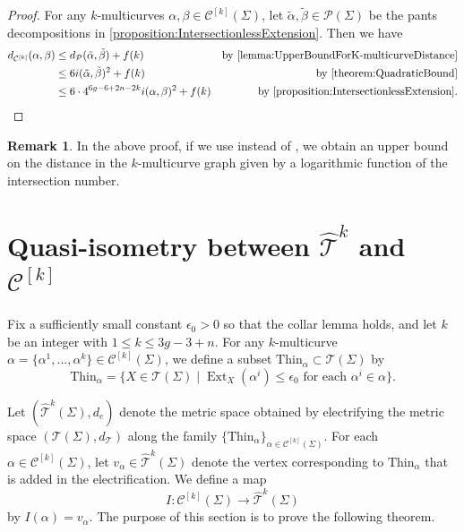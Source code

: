 \documentclass[a4paper,11pt]{amsart}
\numberwithin{equation}{section}
\theoremstyle{definition}
\newtheorem{remark}[theorem]{Remark}
\newcommand{\Teich}{\mathcal{T}}
\newcommand{\elTeich}{\hat{\mathcal{T}}}
\DeclareMathOperator{\Ext}{Ext}
\newcommand{\Thin}{\mathrm{Thin}}
\newcommand{\multicurve}[1]{\mathcal{C}^{[#1]}}
\begin{document}
\begin{proof}
    For any $k$-multicurves $\alpha,\beta\in\multicurve{k}(\Sigma)$, let $\tilde{\alpha},\tilde{\beta}\in \mathcal{P}(\Sigma)$ be the pants decompositions in \cref{proposition:IntersectionlessExtension}.
    Then we have 
    \begin{align*}
        d_{\multicurve{k}}(\alpha,\beta) &\leq d_{\mathcal{P}}(\tilde{\alpha},\tilde{\beta})+f(k) & \text{by \cref{lemma:UpperBoundForK-multicurveDistance}}\\
        & \leq 6i(\tilde{\alpha},\tilde{\beta})^2+f(k) & \text{by \cref{theorem:QuadraticBound}} \\
        & \leq 6\cdot 4^{6g-6+2n-2k}i(\alpha,\beta)^2+f(k) & \text{by \cref{proposition:IntersectionlessExtension}.}
    \end{align*}
\end{proof}

\begin{remark}
In the above proof, if we use  instead of , we obtain an upper bound on the distance in the $k$-multicurve graph given by a logarithmic function of the intersection number.
\end{remark}

\section{Quasi-isometry between $\elTeich^k$ and $\multicurve{k}$}

Fix a sufficiently small constant $\epsilon_0>0$ so that the collar lemma holds, and let $k$ be an integer with $1 \le k \le 3g-3+n$.
For any $k$-multicurve $\alpha = \{\alpha^1,\ldots,\alpha^k\} \in \multicurve{k}(\Sigma)$,
we define a subset $\Thin_\alpha \subset \Teich(\Sigma)$ by
\begin{equation*}
    \Thin_\alpha
    = \bigl\{ X \in \Teich(\Sigma) \mid \Ext_X(\alpha^i) \le \epsilon_0
    \text{ for each } \alpha^i \in \alpha \bigr\}.
\end{equation*}


Let $(\elTeich^k(\Sigma), d_e)$ denote the metric space obtained by electrifying the metric space $(\Teich(\Sigma),d_{\Teich})$ along the family $\{\Thin_\alpha\}_{\alpha \in \multicurve{k}(\Sigma)}$.
For each $\alpha \in \multicurve{k}(\Sigma)$, let $v_\alpha \in \elTeich^k(\Sigma)$
denote the vertex corresponding to $\Thin_\alpha$ that is added in the electrification.
We define a map
\begin{equation*}
    I \colon \multicurve{k}(\Sigma) \longrightarrow \elTeich^k(\Sigma)
\end{equation*}
by $I(\alpha) = v_\alpha$.
The purpose of this section is to prove the following theorem.
\end{document}
